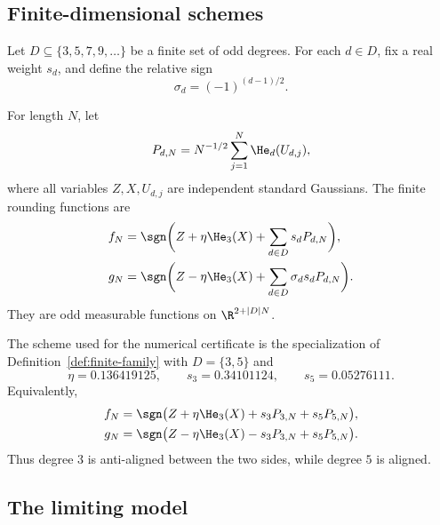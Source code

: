 \subsection{Finite-dimensional schemes}\label{subsec:finite-schemes}

\begin{definition}\label{def:finite-family}
Let $D\subseteq\{3,5,7,9,\ldots\}$ be a finite set of odd degrees.  For each $d\in D$, fix a real weight $s_d$, and define the relative sign
\[
  \sigma_d=(-1)^{(d-1)/2}.
\]

For length $N$, let
\[
  P_{d,N}=N^{-1/2}\sum_{j=1}^N \He_d(U_{d,j}),
\]
where all variables $Z,X,U_{d,j}$ are independent standard Gaussians.  The finite rounding functions are
\begin{align}
  f_N&=\sgn\biggl(Z+\eta \He_3(X)+\sum_{d\in D}s_dP_{d,N}\biggr),\label{eq:finite-f-general}\\
  g_N&=\sgn\biggl(Z-\eta \He_3(X)+\sum_{d\in D}\sigma_d s_dP_{d,N}\biggr).\label{eq:finite-g-general}
\end{align}
They are odd measurable functions on $\R^{2+|D|N}$.  
\end{definition}

\begin{definition}\label{def:finite-35}
The scheme used for the numerical certificate is the specialization of Definition~\ref{def:finite-family} with $D=\{3,5\}$ and
\begin{equation}\label{eq:params}
  \eta=0.136419125,
  \qquad
  s_3=0.34101124,
  \qquad
  s_5=0.05276111.
\end{equation}
Equivalently,
\begin{align}
  f_N&=\sgn\bigl(Z+\eta \He_3(X)+s_3P_{3,N}+s_5P_{5,N}\bigr),\label{eq:finite-f-35}\\
  g_N&=\sgn\bigl(Z-\eta \He_3(X)-s_3P_{3,N}+s_5P_{5,N}\bigr).\label{eq:finite-g-35}
\end{align}
Thus degree $3$ is anti-aligned between the two sides, while degree $5$ is aligned.
\end{definition}

\subsection{The limiting model}\label{subsec:limiting-model}


